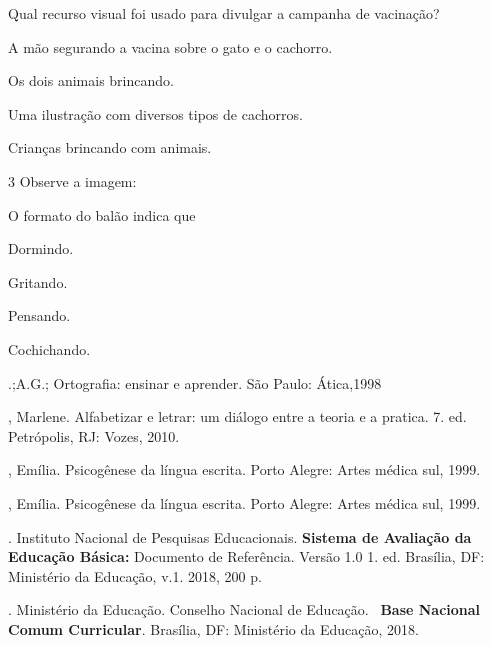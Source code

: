 
Qual recurso visual foi usado para divulgar a campanha de vacinação?

\begin{escolha}
\item A mão segurando a vacina sobre o gato e o cachorro.

\item Os dois animais brincando.

\item Uma ilustração com diversos tipos de cachorros.

\item Crianças brincando com animais.
\end{escolha}

\num{3} Observe a imagem:


O formato do balão indica que

\begin{escolha}
\item Dormindo.

\item Gritando.

\item Pensando.

\item Cochichando.
\end{escolha}


\begin{bibliohedra}
.;A.G.; Ortografia: ensinar e aprender. São Paulo: Ática,1998

, Marlene. Alfabetizar e letrar: um diálogo entre a teoria e a
pratica. 7. ed. Petrópolis, RJ: Vozes, 2010.

, Emília. Psicogênese da língua escrita. Porto Alegre: Artes
médica sul, 1999.

, Emília. Psicogênese da língua escrita. Porto Alegre: Artes
médica sul, 1999.

. Instituto Nacional de Pesquisas Educacionais. \textbf{Sistema de
Avaliação da Educação Básica:} Documento de Referência. Versão 1.0 1.
ed. Brasília, DF: Ministério da Educação, v.1. 2018, 200 p.

. Ministério da Educação. Conselho Nacional de Educação.~
\textbf{Base Nacional Comum Curricular}. Brasília, DF: Ministério da
Educação, 2018.
\end{bibliohedra}

